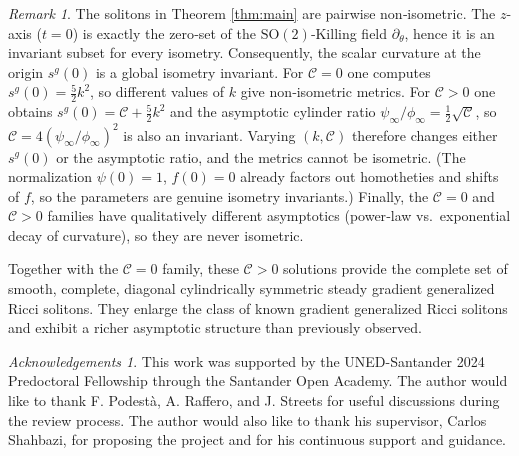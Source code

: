 \documentclass[12pt,a4paper,reqno]{amsart}
\theoremstyle{plain}
\theoremstyle{remark}
\newtheorem{remark}[theorem]{Remark}
\newtheorem*{acknowledgements}{Acknowledgements}
\numberwithin{equation}{section}
\newcommand{\cC}{\mathcal{C}}
\newcommand{\SO}{\mathrm{SO}}
\begin{document}
\begin{remark}
\label{rem:nonisometric}
The solitons in Theorem \ref{thm:main} are pairwise non‑isometric. The $z$-axis ($t=0$) is exactly the zero‑set of the $\SO(2)$‑Killing field $\partial_\theta$, hence it is an invariant subset for every isometry. Consequently, the scalar curvature at the origin $s^g(0)$ is a global isometry invariant. For $\cC=0$ one computes $s^g(0)=\frac52k^2$, so different values of $k$ give non‑isometric metrics. For $\cC>0$ one obtains $s^g(0)=\cC+\frac52k^2$ and the asymptotic cylinder ratio $\psi_\infty/\phi_\infty=\frac12\sqrt{\cC}$, so $\cC=4(\psi_\infty/\phi_\infty)^2$ is also an invariant. Varying $(k,\cC)$ therefore changes either $s^g(0)$ or the asymptotic ratio, and the metrics cannot be isometric. (The normalization $\psi(0)=1$, $f(0)=0$ already factors out homotheties and shifts of $f$, so the parameters are genuine isometry invariants.) Finally, the $\cC=0$ and $\cC>0$ families have qualitatively different asymptotics (power‑law vs.\ exponential decay of curvature), so they are never isometric.
\end{remark}

Together with the $\cC=0$ family, these $\cC>0$ solutions provide the complete set of smooth, complete, diagonal cylindrically symmetric steady gradient generalized Ricci solitons. They enlarge the class of known gradient generalized Ricci solitons and exhibit a richer asymptotic structure than previously observed.


\begin{acknowledgements}
This work was supported by the UNED-Santander 2024 Predoctoral Fellowship through the Santander Open Academy. The author would like to thank F. Podestà, A. Raffero, and J. Streets for useful discussions during the review process. The author would also like to thank his supervisor, Carlos Shahbazi, for proposing the project and for his continuous support and guidance.
\end{acknowledgements}
\end{document}
